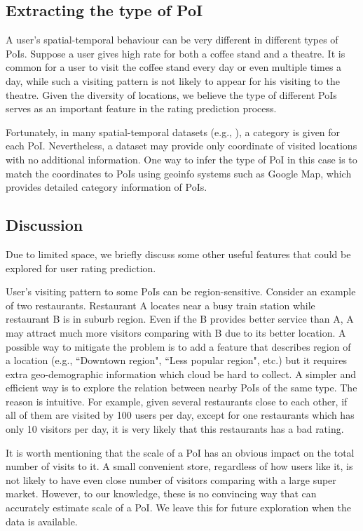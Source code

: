 \subsection{Extracting the type of PoI}

A user's spatial-temporal behaviour can be very different in different types of PoIs. Suppose a user gives high rate for both a coffee stand and a theatre. It is common for a user to visit the coffee stand every day or even multiple times a day, while such a visiting pattern is not likely to appear for his visiting to the theatre. Given the diversity of locations, we believe the type of different PoIs serves as an important feature in the rating prediction process.

Fortunately, in many spatial-temporal datasets (e.g., \cite{yang2014modeling}), a category is given for each PoI. Nevertheless, a dataset may provide only coordinate of visited locations with no additional information. One way to infer the type of PoI in this case is to match the coordinates to PoIs using geoinfo systems such as Google Map, which provides detailed category information of PoIs.

\subsection{Discussion}

Due to limited space, we briefly discuss some other useful features that could be explored for user rating prediction.

 User's visiting pattern to some PoIs can be region-sensitive. Consider an example of two restaurants. Restaurant A locates near a busy train station while restaurant B is in suburb region. Even if the B provides better service than A, A may attract much more visitors comparing with B due to its better location. A possible way to mitigate the problem is to add a feature that describes region of a location (e.g., ``Downtown region", ``Less popular region", etc.) but it requires extra geo-demographic information which cloud be hard to collect. A simpler and efficient way is to explore the relation between nearby PoIs of the same type. The reason is intuitive. For example, given several restaurants close to each other, if all of them are visited by 100 users per day, except for one restaurants which has only 10 visitors per day, it is very likely that this restaurants has a bad rating.

 It is worth mentioning that the scale of a PoI has an obvious impact on the total number of visits to it. A small convenient store, regardless of how users like it, is not likely to have even close number of visitors comparing with a large super market. However, to our knowledge, these is no convincing way that can accurately estimate scale of a PoI. We leave this for future exploration when the data is available.

